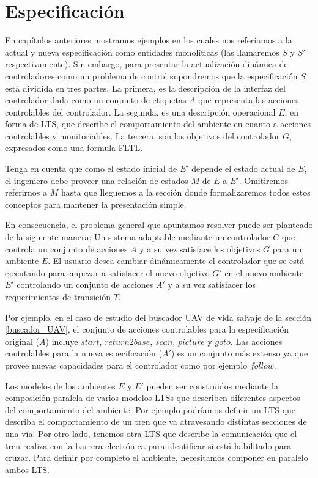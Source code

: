 \section{Especificación}

En capítulos anteriores mostramos ejemplos en los cuales nos referíamos a la actual y nueva especificación como
entidades monolíticas (las llamaremos $S$ y $S'$ respectivamente). Sin embargo, para presentar la actualización dinámica
de controladores como un problema de control supondremos que la especificación $S$ está dividida en tres partes. La
primera, es la descripción de la interfaz del controlador dada como un conjunto de etiquetas $A$ que representa las
acciones controlables del controlador. La segunda, es una descripción operacional $E$, en forma de LTS, que describe el
comportamiento del ambiente en cuanto a acciones controlables y monitoriables. La tercera, son los objetivos del
controlador $G$, expresados como una formula FLTL.

Tenga en cuenta que como el estado inicial de $E'$ depende el estado actual de $E$, el ingeniero debe proveer una relación de estados
$M$ de $E$ a $E'$. Omitiremos referirnos a $M$ hasta que lleguemos a la sección donde formalizaremos todos estos
conceptos para mantener la presentación simple.

En consecuencia, el problema general que apuntamos resolver puede ser planteado de la siguiente manera:
Un sistema adaptable mediante un controlador $C$ que controla un conjunto de acciones $A$ y a su vez satisface los
objetivos $G$ para un ambiente $E$. El usuario desea cambiar dinámicamente el controlador que se está ejecutando para
empezar a satisfacer el nuevo objetivo $G'$ en el nuevo ambiente $E'$ controlando un conjunto de acciones $A'$ y a su
vez satisfacer los requerimientos de transición $T$.

Por ejemplo, en el caso de estudio del buscador UAV de vida salvaje de la sección \ref{buscador_UAV}, el conjunto de acciones
controlables para la especificación original ($A$) incluye $start$, $return2base$, $scan$, $picture$ y $goto$. Las
acciones controlables para la nueva especificación ($A'$) es un conjunto más extenso ya que provee nuevas capacidades para el
controlador como por ejemplo $follow$.

Los modelos de los ambientes $E$ y $E'$ pueden ser construidos mediante la composición paralela de varios modelos LTSs
que describen diferentes aspectos del comportamiento del ambiente. Por ejemplo podríamos definir un LTS que describa el
comportamiento de un tren que va atravesando distintas secciones de una vía. Por otro lado, tenemos otra LTS que
describe la comunicación que el tren realiza con la barrera electrónica para identificar si está habilitado para cruzar.
Para definir por completo el ambiente, necesitamos componer en paralelo ambos LTS. 

